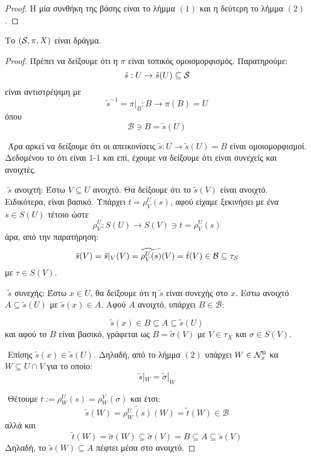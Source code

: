 \begin{proof}
    Η μία συνθήκη της βάσης είναι το λήμμα $(1)$ και η δεύτερη το λήμμα $(2)$.
\end{proof}

\vspace*{0.3cm}
\begin{prop}
    Το $(\mathcal{S}, \pi, X)$ είναι δράγμα.
\end{prop}

\begin{proof} Πρέπει να δείξουμε ότι η $\pi$ είναι τοπικός ομοιομορφισμός. Παρατηρούμε:
    $$\tilde{s} : U \rightarrow \tilde{s} (U) \subseteq \mathcal{S}$$ είναι αντιστρέψιμη με 
    $$\tilde{s}^{-1} = \pi|_{B}: B \longrightarrow \pi(B) = U$$ όπου
    $$ \mathcal{B} \ni B = \tilde{s}(U)$$

    $ $\newline
    Άρα αρκεί να δείξουμε ότι οι απεικονίσεις $\tilde{s}: U \rightarrow \tilde{s}(U) = B$ είναι ομοιομορφισμοί. Δεδομένου το ότι είναι 1-1 και επί, έχουμε να δείξουμε ότι είναι συνεχείς και ανοιχτές.

    $ $\newline
    $\tilde{s}$ ανοιχτή: Έστω $V \subseteq U$ ανοιχτό. Θα δείξουμε ότι το $\tilde{s} (V)$ είναι ανοιχτό. Ειδικότερα, είναι βασικό. Υπάρχει $t = \rho^U_V(s)$, αφού είχαμε ξεκινήσει με ένα $s \in S(U)$ τέτοιο ώστε 
    $$\rho^U_V : S(U)\longrightarrow S(V) \ni t = \rho^U_V(s)$$
    άρα, από την παρατήρηση:
    $$\tilde{s}(V) = \tilde{s}|_V (V) = \widetilde{\rho^U_V(s)}(V) = \tilde{t}(V) \in \mathcal{B} \subseteq \tau_{\mathcal{S}}$$ με $\tau \in S(V)$.

    $ $\newline
    $\tilde{s}$ συνεχής: Έστω $x \in U$, θα δείξουμε ότι η $\tilde{s}$ είναι συνεχής στο $x$. Εστω ανοιχτό $A\subseteq \tilde{s}(U)$ με $\tilde{s}(x) \in A$. Αφού $A$ ανοιχτό, υπάρχει $B \in \mathcal{B}:$

    $$\tilde{s}(x) \in B \subseteq A \subseteq \tilde{s}(U)$$
    και αφού το $B$ είναι βασικό, γράφεται ως $B = \tilde{\sigma}(V)$ με $V \in \tau_X$ και $\sigma \in S(V)$.

    $ $\newline
    Επίσης $\tilde{s}(x) \in \tilde{s}(U)$. Δηλαδή, από το λήμμα $(2)$ υπάρχει $W \in \mathcal{N}^0_x$ κα $ W \subseteq U\cap V$ για το οποίο:
    $$\tilde{s}|_W = \tilde{\sigma}|_W$$

    $ $\newline
    Θέτουμε $t:= \rho^U_W (s)  = \rho^V_W (\sigma)$ και έτσι:
    $$\tilde{s}(W) = \widetilde{\rho^U_W(s)}(W) = \tilde{t}(W) \in \mathcal{B}$$ αλλά και 
    $$\tilde{t}(W) = \tilde{\sigma}(W) \subseteq \tilde{\sigma}(V) = B \subseteq A \subseteq \tilde{s}(V)$$
    Δηλαδή, το $\tilde{s}(W) \subseteq A$ πέφτει μέσα στο ανοιχτό.
\end{proof}

